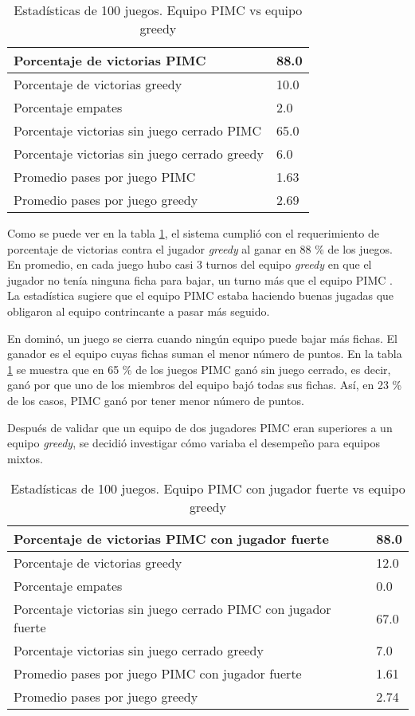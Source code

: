 \begin{table}[!ht]
    \centering
    \caption{Estadísticas de 100 juegos. Equipo PIMC vs equipo greedy}
    \begin{tabular}{|l|l|}
    \hline
        Porcentaje de victorias PIMC & 88.0 \\ \hline
        Porcentaje de victorias greedy & 10.0 \\ \hline
        Porcentaje empates & 2.0 \\ \hline
        Porcentaje victorias sin juego cerrado PIMC & 65.0 \\ \hline
        Porcentaje victorias sin juego cerrado greedy & 6.0 \\ \hline
        Promedio pases por juego PIMC & 1.63 \\ \hline
        Promedio pases por juego greedy & 2.69 \\ \hline
    \end{tabular}
    \label{MINP}
\end{table}

Como se puede ver en la tabla \ref{MINP}, el sistema cumplió con el
requerimiento de porcentaje de victorias contra el jugador \textit{greedy} al
ganar en 88 \% de los juegos. En promedio, en cada juego hubo casi 3 turnos del
equipo \textit{greedy} en que el jugador no tenía ninguna ficha para bajar, un
turno más que el equipo PIMC . La estadística sugiere que el equipo PIMC estaba
haciendo buenas jugadas que obligaron al equipo contrincante a pasar más
seguido.

En dominó, un juego se cierra cuando ningún equipo puede bajar más fichas. El
ganador es el equipo cuyas fichas suman el menor número de puntos. En la tabla
\ref{MINP} se muestra que en 65 \% de los juegos PIMC ganó sin juego cerrado, es
decir, ganó por que uno de los miembros del equipo bajó todas sus fichas. Así,
en 23 \% de los casos, PIMC ganó por tener menor número de puntos.


Después de validar que un equipo de dos jugadores PIMC eran superiores a un
equipo \textit{greedy}, se decidió investigar cómo variaba el desempeño para
equipos mixtos.

\begin{table}[!ht]
    \centering
    \caption{Estadísticas de 100 juegos. Equipo PIMC con jugador fuerte vs equipo greedy}
    \begin{tabular}{|l|l|}
    \hline
        Porcentaje de victorias PIMC con jugador fuerte & 88.0 \\ \hline
        Porcentaje de victorias greedy & 12.0 \\ \hline
        Porcentaje empates & 0.0 \\ \hline
        Porcentaje victorias sin juego cerrado PIMC con jugador fuerte & 67.0 \\ \hline
        Porcentaje victorias sin juego cerrado greedy & 7.0 \\ \hline
        Promedio pases por juego PIMC con jugador fuerte & 1.61 \\ \hline
        Promedio pases por juego greedy & 2.74 \\ \hline
    \end{tabular}
    \label{MIXS}
\end{table}

